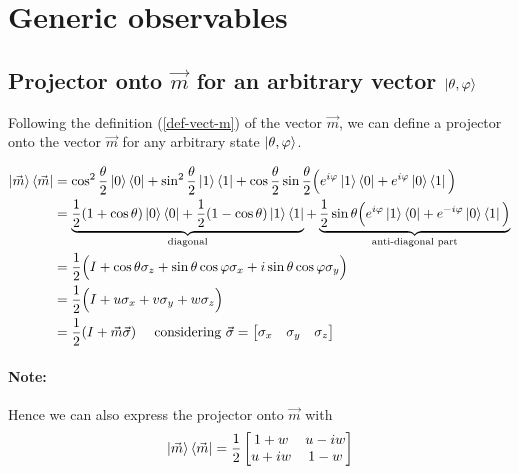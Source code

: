 \documentclass{article}
\begin{document}
\section{Generic observables}
\subsection{Projector onto \texorpdfstring{$\vec{m}$}{Lg}
for an arbitrary vector \texorpdfstring{$\ket{\theta, \varphi}$}{Lg}}

Following the definition (\ref{def-vect-m}) of the vector $\vec{m}$, we can define a projector onto
the vector $\vec{m}$ for any arbitrary state $\ket{\theta, \varphi}$.

\begin{equation}
    \begin{aligned}
        \label{projector-onto-m}
        \ket{\vec{m}}\bra{\vec{m}}
            & = \cos^2\frac{\theta}{2}\ket{0}\bra{0}+\sin^2\frac{\theta}{2}\ket{1}\bra{1} +
                \cos\frac{\theta}{2}\sin\frac{\theta}{2}\Big(e^{i\varphi}\ket{1}\bra{0}+e^{i\varphi}
                \ket{0}\bra{1}\Big) \\
            & = \underbrace{\frac{1}{2}(1+\cos\theta)\ket{0}\bra{0}+
                \frac{1}{2}(1-\cos\theta)\ket{1}\bra{1}}_{\text{diagonal}} +
                \underbrace{\frac{1}{2}\sin\theta
                \Big(e^{i\varphi}\ket{1}\bra{0}+e^{-i\varphi}\ket{0}\bra{1}\Big)}_{
                \text{anti-diagonal part}} \\
            & = \frac{1}{2}\Big(I + \cos\theta\sigma_z + \sin\theta\cos\varphi\sigma_x +
            i\sin\theta\cos\varphi\sigma_y \Big) \\
            & = \frac{1}{2}\Big(I + u\sigma_x + v\sigma_y + w\sigma_z \Big) \\
            & = \frac{1}{2}(I+\vec{m}\vec{\sigma})
                \quad \text{ considering } \vec{\sigma}=\begin{bmatrix}\sigma_x & \sigma_y &
                \sigma_z\end{bmatrix}
    \end{aligned}
\end{equation}

\paragraph{Note: } Hence we can also express the projector onto $\vec{m}$ with
\begin{equation}
    \ket{\vec{m}}\bra{\vec{m}}= \frac{1}{2}\begin{bmatrix}
        1+w & u-iw \\ u+iw & 1-w
    \end{bmatrix}
\end{equation}
\end{document}
